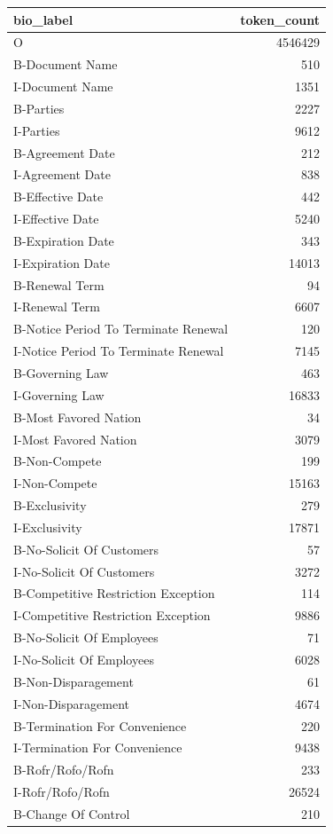 \begin{tabular}{lr}
\toprule
bio\_label & token\_count \\
\midrule
O & 4546429 \\
B-Document Name & 510 \\
I-Document Name & 1351 \\
B-Parties & 2227 \\
I-Parties & 9612 \\
B-Agreement Date & 212 \\
I-Agreement Date & 838 \\
B-Effective Date & 442 \\
I-Effective Date & 5240 \\
B-Expiration Date & 343 \\
I-Expiration Date & 14013 \\
B-Renewal Term & 94 \\
I-Renewal Term & 6607 \\
B-Notice Period To Terminate Renewal & 120 \\
I-Notice Period To Terminate Renewal & 7145 \\
B-Governing Law & 463 \\
I-Governing Law & 16833 \\
B-Most Favored Nation & 34 \\
I-Most Favored Nation & 3079 \\
B-Non-Compete & 199 \\
I-Non-Compete & 15163 \\
B-Exclusivity & 279 \\
I-Exclusivity & 17871 \\
B-No-Solicit Of Customers & 57 \\
I-No-Solicit Of Customers & 3272 \\
B-Competitive Restriction Exception & 114 \\
I-Competitive Restriction Exception & 9886 \\
B-No-Solicit Of Employees & 71 \\
I-No-Solicit Of Employees & 6028 \\
B-Non-Disparagement & 61 \\
I-Non-Disparagement & 4674 \\
B-Termination For Convenience & 220 \\
I-Termination For Convenience & 9438 \\
B-Rofr/Rofo/Rofn & 233 \\
I-Rofr/Rofo/Rofn & 26524 \\
B-Change Of Control & 210 \\

\end{tabular}
